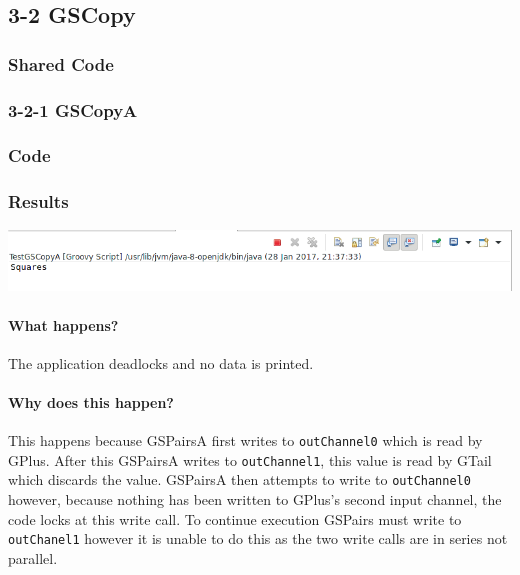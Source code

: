 \subsection{3-2 GSCopy}

\subsubsection*{Shared Code}


\subsubsection{3-2-1 GSCopyA}

\subsubsection*{Code}


\subsubsection*{Results}

\includegraphics[width=\textwidth]{img/screenshots/3-2-1.png}

\paragraph{What happens?}

The application deadlocks and no data is printed.

\paragraph{Why does this happen?}

This happens because GSPairsA first writes to \texttt{outChannel0} which is read by GPlus.  After this GSPairsA writes to \texttt{outChannel1}, this value is read by GTail which discards the value.  GSPairsA then attempts to write to \texttt{outChannel0} however, because nothing has been written to GPlus's second input channel, the code locks at this write call.  To continue execution GSPairs must write to \texttt{outChanel1} however it is unable to do this as the two write calls are in series not parallel.


